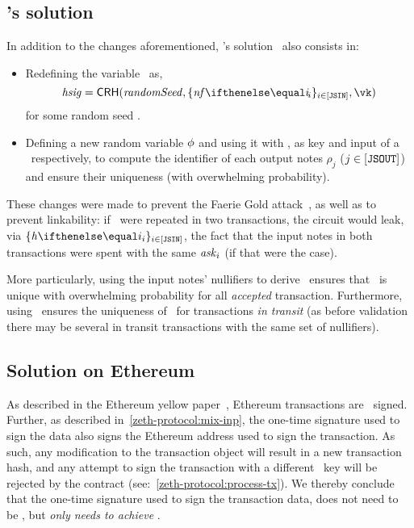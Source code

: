 \subsection{\zcash's solution}\label{appendix:trnm:ssec:zcash-trnm}

In addition to the changes aforementioned, \zcash's solution~\cite{zcashprotocol} also consists in:
\begin{itemize}
    \item Redefining the variable \hsig~as,
    \[
        \hsig = \crh(\randomSeed, \indexedset{\nf{i}}{i \in [\jsin]}, \vk)
    \]
    for some random seed \randomSeed.
\item Defining a new random variable $\mathit{\phi}$ and using it with \hsig, as key and input of a \prf~respectively, to compute the identifier of each output notes $\rho_j$ ($j \in [\mathtt{JSOUT}]$) and ensure their uniqueness (with overwhelming probability).
\end{itemize}
These changes were made to prevent the Faerie Gold attack~\cite[Section 8.4]{zcashprotocol}, as well as to prevent linkability: if \hsig~were repeated in two transactions, the circuit would leak, via $\indexedset{\htag{i}}{i \in [\jsin]}$, the fact that the input notes in both transactions were spent with the same $\mathit{ask}_{i}$ (if that were the case).

More particularly, using the input notes' nullifiers to derive \hsig~ensures that \hsig~is unique with overwhelming probability for all \emph{accepted} transaction.
Furthermore, using \randomSeed~ensures the uniqueness of \hsig~for transactions \emph{in transit} (as before validation there may be several in transit transactions with the same set of nullifiers).

\subsection{Solution on Ethereum}\label{appendix:trnm:preliminaries:ethereum-trnm}

As described in the Ethereum yellow paper~\cite[Appendix F]{ethyellowpaper}, Ethereum transactions are \ecdsa~signed. Further, as described in~\cref{zeth-protocol:mix-inp}, the one-time signature used to sign the \mix{} data also signs the Ethereum address used to sign the transaction. As such, any modification to the transaction object will result in a new transaction hash, and any attempt to sign the transaction with a different \ecdsa~key will be rejected by the \mixer{} contract (see:~\cref{zeth-protocol:process-tx}). We thereby conclude that the one-time signature used to sign the transaction data, does not need to be \sufcma, but \emph{only needs to achieve \ufcma}.

